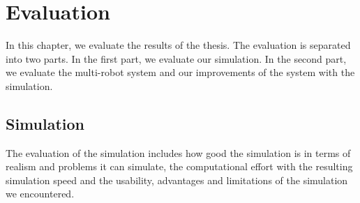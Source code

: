 \chapter{Evaluation}
\label{cha:evaluation}
In this chapter, we evaluate the results of the thesis. The evaluation is separated into two parts. In the first part, we evaluate our simulation. In the second part, we evaluate the multi-robot system and our improvements of the system with the simulation.

\section{Simulation}
\label{sec:simulation}
The evaluation of the simulation includes how good the simulation is in terms of realism and problems it can simulate, the computational effort with the resulting simulation speed and the usability, advantages and limitations of the simulation we encountered. 

